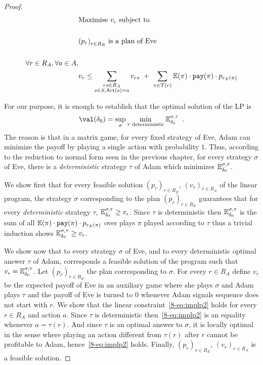 \begin{proof}
\begin{align}
&\text{Maximise $v_{\epsilon}$ subject to}
\notag\\
\notag\\
\notag&\text{$\left(p_r\right)_{r \in R_E}$ is a plan of Eve}
\notag\\
\notag\\
\notag\forall r \in R_A,
\forall a \in A,&
\\
&
\label{eq:implp2}
v_{r} \leq \sum\limits_{\substack{rs \in R_A\\s \in S, \text{Act}(s)=a}}
v_{rs}~+~\sum\limits_{\pi \in T(r)} \mathbb{E}(\pi) \cdot {\tt pay}(\pi) \cdot 
p_{r_E(\pi)}
\end{align}

For our purpose,
it is enough to establish 
that the optimal solution of the LP
is 
\[
\val(\ini) = \sup_\sigma \min\limits_{\tau\text{ deterministic}} \mathbb{E}_{\ini}^{\sigma,\tau}\enspace.
\]
The reason is that in a matrix game,
for every fixed strategy of Eve,
Adam can minimize the payoff by playing a single action
with probability $1$.
Thus, according to the reduction to normal form seen in the previous chapter,
for every strategy $\sigma$ of Eve,
there is a \emph{deterministic} strategy $\tau$ of Adam
which minimizes $\mathbb{E}_{\delta_0}^{\sigma,\tau}$.



We show first that for every feasible solution 
$(p_r)_{r \in R_E}$, $(v_r)_{r\in R_A}$ of the linear program,
the strategy $\sigma$ corresponding to the plan $(p_r)_{r \in R_E}$
guarantees that for every \emph{deterministic} strategy $\tau$,
$\mathbb{E}_{\delta_0}^{\sigma,\tau} \geq v_\epsilon$.
Since $\tau$ is deterministic
then $\mathbb{E}_{\delta_0}^{\sigma,\tau}$
is the sum of all $\mathbb{E}(\pi) \cdot {\tt pay}(\pi) \cdot 
p_{r_E(\pi)}$ over plays $\pi$ played according to $\tau$
thus a trivial induction shows $\mathbb{E}_{\delta_0}^{\sigma,\tau}\geq v_\epsilon$.

We show now that to every strategy $\sigma$ of Eve,
and to every deterministic optimal answer $\tau$ of Adam, 
corresponds a feasible solution of the program
such that $v_\epsilon = \mathbb{E}_{\delta_0}^{\sigma,\tau}$.
Let  $(p_r)_{r \in R_E}$ the plan corresponding to $\sigma$.
For every $r\in R_A$ define $v_r$ be the expected payoff of Eve
in an auxiliary game where she plays $\sigma$
and Adam plays $\tau$ and the payoff of Eve is turned to $0$
whenever Adam signals sequence does not start with $r$.
We show that the linear constraint~\cref{8-eq:implp2} holds for every $r\in R_A$
 and action $a$.
Since $\tau$ is deterministic then~\cref{8-eq:implp2} is an equality
whenever $a=\tau(r)$.
And since $\tau$ is an optimal answer to $\sigma$,
it is locally optimal in the sense where playing an action
different from $\tau(r)$ after $r$ cannot be profitable to Adam,
hence~\cref{8-eq:implp2} holds.
Finally, $(p_r)_{r \in R_E}$, $(v_r)_{r\in R_A}$ is a feasible solution.
\end{proof}

